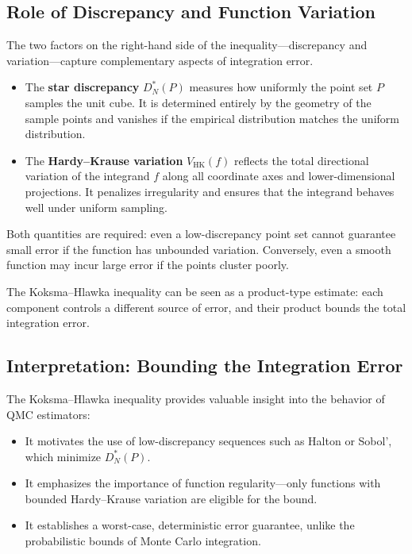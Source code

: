 \subsection{Role of Discrepancy and Function Variation}

The two factors on the right-hand side of the inequality—discrepancy and variation—capture complementary aspects of integration error.

\begin{itemize}
    \item The \textbf{star discrepancy} $D_N^*(P)$ measures how uniformly the point set $P$ samples the unit cube. It is determined entirely by the geometry of the sample points and vanishes if the empirical distribution matches the uniform distribution.
    \item The \textbf{Hardy--Krause variation} $V_{\mathrm{HK}}(f)$ reflects the total directional variation of the integrand $f$ along all coordinate axes and lower-dimensional projections. It penalizes irregularity and ensures that the integrand behaves well under uniform sampling.
\end{itemize}

Both quantities are required: even a low-discrepancy point set cannot guarantee small error if the function has unbounded variation. Conversely, even a smooth function may incur large error if the points cluster poorly.

\begin{remark}
The Koksma--Hlawka inequality can be seen as a product-type estimate: each component controls a different source of error, and their product bounds the total integration error.
\end{remark}


\subsection{Interpretation: Bounding the Integration Error}

The Koksma--Hlawka inequality provides valuable insight into the behavior of QMC estimators:

\begin{itemize}
    \item It motivates the use of low-discrepancy sequences such as Halton or Sobol', which minimize $D_N^*(P)$.
    \item It emphasizes the importance of function regularity—only functions with bounded Hardy--Krause variation are eligible for the bound.
    \item It establishes a worst-case, deterministic error guarantee, unlike the probabilistic bounds of Monte Carlo integration.
\end{itemize}

